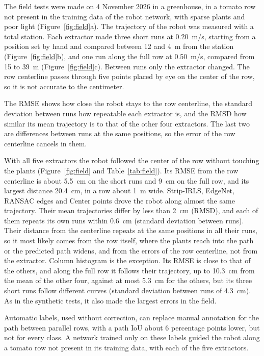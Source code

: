 \documentclass[10pt,a4paper,twocolumn]{article}
\makeatletter
\renewcommand\section{\@startsection{section}{1}{\z@}{-1.4ex plus -0.5ex minus -0.2ex}{0.6ex plus 0.2ex}{\normalfont\large\bfseries}}
\makeatother
\begin{document}
The field tests were made on 4 November 2026 in a greenhouse, in a tomato row not present in the training data of the robot network, with sparse plants and poor light (Figure~\ref{fig:field}a). The trajectory of the robot was measured with a total station. Each extractor made three short runs at 0.20~m/s, starting from a position set by hand and compared between 12 and 4~m from the station (Figure~\ref{fig:field}b), and one run along the full row at 0.50~m/s, compared from 15 to 39~m (Figure~\ref{fig:field}c). Between runs only the extractor changed. The row centerline passes through five points placed by eye on the center of the row, so it is not accurate to the centimeter.

The RMSE shows how close the robot stays to the row centerline, the standard deviation between runs how repeatable each extractor is, and the RMSD how similar its mean trajectory is to that of the other four extractors. The last two are differences between runs at the same positions, so the error of the row centerline cancels in them.

With all five extractors the robot followed the center of the row without touching the plants (Figure~\ref{fig:field} and Table~\ref{tab:field}). Its RMSE from the row centerline is about 5.5~cm on the short runs and 9~cm on the full row, and its largest distance 20.4~cm, in a row about 1~m wide. Strip-IRLS, EdgeNet, RANSAC edges and Center points drove the robot along almost the same trajectory. Their mean trajectories differ by less than 2~cm (RMSD), and each of them repeats its own runs within 0.6~cm (standard deviation between runs). Their distance from the centerline repeats at the same positions in all their runs, so it most likely comes from the row itself, where the plants reach into the path or the predicted path widens, and from the errors of the row centerline, not from the extractor. Column histogram is the exception. Its RMSE is close to that of the others, and along the full row it follows their trajectory, up to 10.3~cm from the mean of the other four, against at most 5.3~cm for the others, but its three short runs follow different curves (standard deviation between runs of 4.3~cm). As in the synthetic tests, it also made the largest errors in the field.

\balance
\section{Conclusions}

Automatic labels, used without correction, can replace manual annotation for the path between parallel rows, with a path IoU about 6 percentage points lower, but not for every class. A network trained only on these labels guided the robot along a tomato row not present in its training data, with each of the five extractors.
\end{document}
